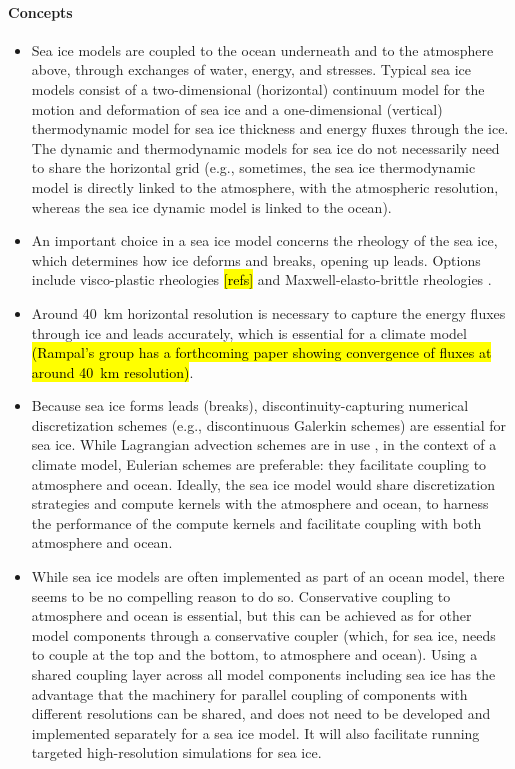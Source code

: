 \documentclass{article}
\begin{document}
\paragraph{Concepts}
\begin{itemize}
\item Sea ice models are coupled to the ocean underneath and to the atmosphere above, through exchanges of water, energy, and stresses. Typical sea ice models consist of a two-dimensional (horizontal) continuum model for the motion and deformation of sea ice and a one-dimensional (vertical) thermodynamic model \citep[e.g..][]{Semtner76a} for sea ice thickness and energy fluxes through the ice. The dynamic and thermodynamic models for sea ice do not necessarily need to share the horizontal grid (e.g., sometimes, the sea ice thermodynamic model is directly linked to the atmosphere, with the atmospheric resolution, whereas the sea ice dynamic model is linked to the ocean).
\item An important choice in a sea ice model concerns the rheology of the sea ice, which determines how ice deforms and breaks, opening up leads. Options include visco-plastic rheologies \hl{[refs]} and Maxwell-elasto-brittle rheologies \citep{Dansereau16a,Weiss17a,Dansereau17a}.
\item Around 40~km horizontal resolution is necessary to capture the energy fluxes through ice and leads accurately, which is essential for a climate model \hl{(Rampal's group has a forthcoming paper showing convergence of fluxes at around 40~km resolution)}.
\item Because sea ice forms leads (breaks), discontinuity-capturing numerical discretization schemes (e.g., discontinuous Galerkin schemes) are essential for sea ice. While Lagrangian advection schemes are in use \citep{Rampal16a}, in the context of a climate model, Eulerian schemes are preferable: they facilitate coupling to atmosphere and ocean. Ideally, the sea ice model would share discretization strategies and compute kernels with the atmosphere and ocean, to harness the performance of the compute kernels and facilitate coupling with both atmosphere and ocean.
\item While sea ice models are often implemented as part of an ocean model, there seems to be no compelling reason to do so. Conservative coupling to atmosphere and ocean is essential, but this can be achieved as for other model components through a conservative coupler (which, for sea ice, needs to couple at the top and the bottom, to atmosphere and ocean). Using a shared coupling layer across all model components including sea ice has the advantage that the machinery for parallel coupling of components with different resolutions can be shared, and does not need to be developed and implemented separately for a sea ice model. It will also facilitate running targeted high-resolution simulations for sea ice.

\end{itemize}
\end{document}
